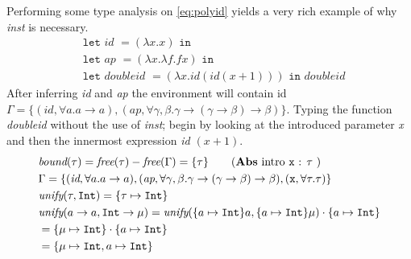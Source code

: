 \begin{exmp}
    Performing some type analysis on \autoref{eq:polyid} yields a very rich example of why \textit{inst} is necessary.
    \begin{align}
      &\texttt{let } \textit{id } = (\lambda x.x) \texttt{ in } \label{eq:polyid}\\
      &\texttt{let } \textit{ap } = (\lambda x . \lambda f . f x) \texttt{ in } \tag*{}\\
      &\texttt{let } \textit{doubleid } = (\lambda x.id (id (x + 1))) \texttt{ in } \textit{doubleid} \tag*{}
    \end{align}
    After inferring \textit{id} and \textit{ap} the environment will contain id $\Gamma = \{ (\textit{id}, \forall a . a \rightarrow a), (\textit{ap}, \forall \gamma,\beta . \gamma \rightarrow (\gamma \rightarrow \beta) \rightarrow \beta)\}$.
    Typing the function \textit{doubleid} without the use of \textit{inst}; begin by looking at the introduced parameter \textit{x} and then the innermost expression \textit{id $(x + 1)$}. 
\begin{align}
    &\textit{bound}(\tau) = \textit{free}(\tau) - \textit{free}(\Gamma) = \{ \tau \} \tag{\textbf{Abs} intro \texttt{x} : $\tau$ }\\
    &\Gamma = \{ (\textit{id}, \forall a . a \rightarrow a), (\textit{ap}, \forall \gamma,\beta . \gamma \rightarrow (\gamma \rightarrow \beta) \rightarrow \beta), (\texttt{x}, \forall \tau . \tau) \}\\
    &\textit{unify}(\tau, \texttt{Int}) = \{ \tau \mapsto \texttt{Int} \}\\
    &\textit{unify}(a \rightarrow a, \texttt{Int} \rightarrow \mu) = \textit{unify}(\{ a \mapsto \texttt{Int} \}a, \{ a \mapsto \texttt{Int} \}\mu) \cdot \{ a \mapsto \texttt{Int} \}\\
    &= \{ \mu \mapsto \texttt{Int} \} \cdot \{ a \mapsto \texttt{Int} \} \tag*{}\\
    &= \{ \mu \mapsto \texttt{Int}, a \mapsto \texttt{Int} \} \tag*{}
    \label{eq:unifyres}
\end{align}

\end{exmp}
